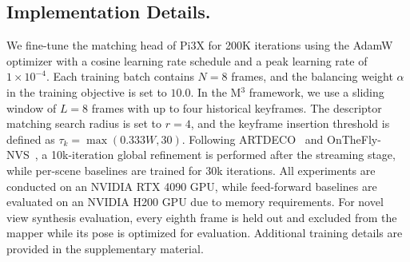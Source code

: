 \subsection{Implementation Details.} We fine-tune the matching head of Pi3X for 200K iterations using the AdamW optimizer with a cosine learning rate schedule and a peak learning rate of $1\times10^{-4}$. Each training batch contains $N=8$ frames, and the balancing weight $\alpha$ in the training objective is set to $10.0$. In the M$^3$ framework, we use a sliding window of $L=8$ frames with up to four historical keyframes. The descriptor matching search radius is set to $r=4$, and the keyframe insertion threshold is defined as $\tau_k = \max(0.333W, 30)$. Following ARTDECO~\cite{artdeco} and OnTheFly-NVS~\cite{meuleman2025fly}, a 10k-iteration global refinement is performed after the streaming stage, while per-scene baselines are trained for 30k iterations. All experiments are conducted on an NVIDIA RTX 4090 GPU, while feed-forward baselines are evaluated on an NVIDIA H200 GPU due to memory requirements. For novel view synthesis evaluation, every eighth frame is held out and excluded from the mapper while its pose is optimized for evaluation. Additional training details are provided in the supplementary material.


